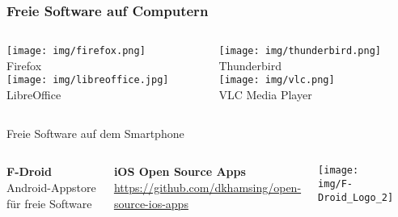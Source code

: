 \begin{frame}
  \frametitle{Freie Software auf Computern}
    \begin{columns}
        \begin{column}{5cm}
            \begin{center}
                \texttt{[image: img/firefox.png]} \\
                Firefox \\
                \vspace{0.1\textheight}
                \texttt{[image: img/libreoffice.jpg]}\\
                LibreOffice
            \end{center}
        \end{column}
        \begin{column}{5cm}
            \begin{center}
                \texttt{[image: img/thunderbird.png]} \\
                Thunderbird \\
                \vspace{0.1\textheight}
                \texttt{[image: img/vlc.png]}\\
                VLC Media Player
            \end{center}
        \end{column}
    \end{columns}
\end{frame}


\begin{frame}{Freie Software auf dem Smartphone}
  \begin{columns}
    \column{6.5cm}

    \textbf{F-Droid}\\
    Android-Appstore für freie Software

    \vspace{0.5cm}

    \textbf{iOS Open Source Apps}\\
    \url{https://github.com/dkhamsing/open-source-ios-apps}

    \column{5cm}

    \begin{center}
      \texttt{[image: img/F-Droid\_Logo\_2]}
    \par\end{center}
    \begin{center}
    \par\end{center}
  \end{columns}
\end{frame}


